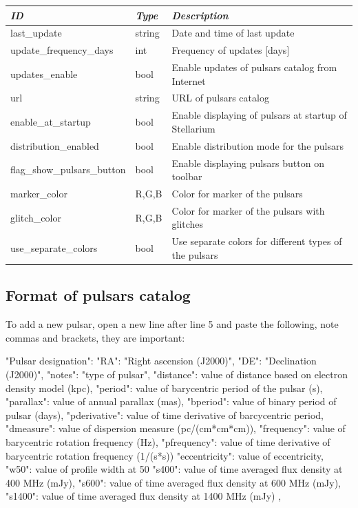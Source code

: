 \begin{tabularx}{\textwidth}{l|l|X}\toprule
\emph{ID}               & \emph{Type} & \emph{Description}\\\midrule
last\_update                & string & Date and time of last update\\%
update\_frequency\_days     & int    & Frequency of updates [days]\\%
updates\_enable             & bool   & Enable updates of pulsars catalog from Internet \\%
url                         & string & URL of pulsars catalog \\%
enable\_at\_startup         & bool   & Enable displaying of pulsars at startup of Stellarium \\%
distribution\_enabled       & bool   & Enable distribution mode for the pulsars \\%
flag\_show\_pulsars\_button & bool   & Enable displaying pulsars button on toolbar \\%
marker\_color               & R,G,B  & Color for marker of the pulsars \\%
glitch\_color               & R,G,B  & Color for marker of the pulsars with glitches \\%
use\_separate\_colors       & bool   & Use separate colors for different types of the pulsars \\\bottomrule
\end{tabularx}

\newpage
\subsection{Format of pulsars catalog}
\label{sec:plugins:Pulsars:format}

To add a new pulsar, open a new line after line 5 and paste the following, note commas and brackets, they are important:

\begin{configfile}
"Pulsar designation":
{
    "RA": "Right ascension (J2000)",
    "DE": "Declination (J2000)",
    "notes": "type of pulsar",
    "distance": value of distance based on electron density 
                model (kpc),
    "period": value of barycentric period of the pulsar (s),
    "parallax": value of annual parallax (mas),
    "bperiod": value of binary period of pulsar (days),
    "pderivative": value of time derivative of barcycentric 
                   period,
    "dmeasure": value of dispersion measure (pc/(cm*cm*cm)),
    "frequency": value of barycentric rotation frequency (Hz),
    "pfrequency": value of time derivative of barycentric 
                  rotation frequency (1/(s*s))
    "eccentricity": value of eccentricity,                   
    "w50": value of profile width at 50%
    "s400": value of time averaged flux density at 
            400 MHz (mJy),
    "s600": value of time averaged flux density at 
            600 MHz (mJy),
    "s1400": value of time averaged flux density at 
             1400 MHz (mJy)    
},
\end{configfile}

